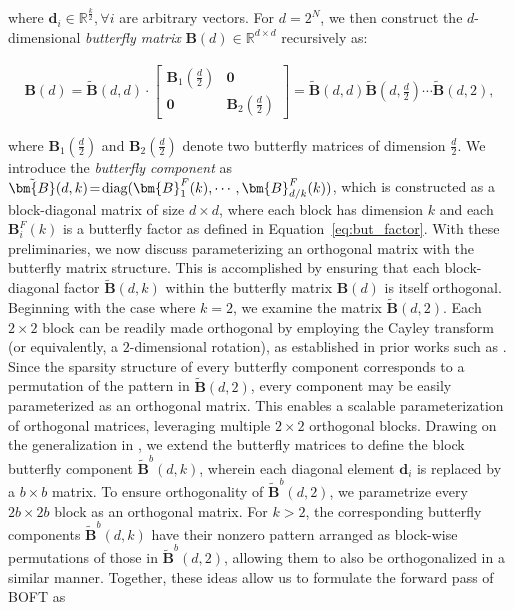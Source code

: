 where $\bm{d}_i\in\mathbb{R}^{\frac{k}{2}},\forall i$ are arbitrary vectors. For $d = 2^N$, we then construct the $d$-dimensional \emph{butterfly matrix} $\bm{B}(d)\in\mathbb{R}^{d\times d}$ recursively as:

\begin{equation}
\begin{aligned}
    \!\!\bm{B}(d)=\tilde{\bm{B}}(d,d)\!\cdot\!\begin{bmatrix}
    \bm{B}_1(\frac{d}{2})\!\!\!\!\! & \bm{0} \\
    \bm{0}\!\!\!\!\! &\bm{B}_2(\frac{d}{2})
    \end{bmatrix}= \tilde{\bm{B}}(d,d)\tilde{\bm{B}}(d,\frac{d}{2})\cdots\tilde{\bm{B}}(d,2),
\end{aligned}
\end{equation}

where $\bm{B}_1(\frac{d}{2})$ and $\bm{B}_2(\frac{d}{2})$ denote two butterfly matrices of dimension $\frac{d}{2}$. We introduce the \emph{butterfly component} as $\thickmuskip=2mu \medmuskip=2mu \tilde{\bm{B}}(d,k)=\text{diag}(\bm{B}^F_1(k),\cdots,\bm{B}^F_{d/k}(k))$, which is constructed as a block-diagonal matrix of size $d\times d$, where each block has dimension $k$ and each $\bm{B}^F_i(k)$ is a butterfly factor as defined in Equation~\ref{eq:but_factor}. With these preliminaries, we now discuss parameterizing an orthogonal matrix with the butterfly matrix structure. This is accomplished by ensuring that each block-diagonal factor $\tilde{\bm{B}}(d,k)$ within the butterfly matrix $\bm{B}(d)$ is itself orthogonal. Beginning with the case where $k=2$, we examine the matrix $\tilde{\bm{B}}(d,2)$. Each $2 \times 2$ block can be readily made orthogonal by employing the Cayley transform (or equivalently, a $2$-dimensional rotation), as established in prior works such as \cite{liu2021orthogonal,qiu2023controlling}. Since the sparsity structure of every butterfly component corresponds to a permutation of the pattern in $\tilde{\bm{B}}(d,2)$, every component may be easily parameterized as an orthogonal matrix. This enables a scalable parameterization of orthogonal matrices, leveraging multiple $2\times 2$ orthogonal blocks. Drawing on the generalization in \cite{chen2022pixelated}, we extend the butterfly matrices to define the block butterfly component $\tilde{\bm{B}}^b(d,k)$, wherein each diagonal element $\bm{d}_i$ is replaced by a $b\times b$ matrix. To ensure orthogonality of $\tilde{\bm{B}}^b(d,2)$, we parametrize every $2b\times 2b$ block as an orthogonal matrix. For $k>2$, the corresponding butterfly components $\tilde{\bm{B}}^b(d,k)$ have their nonzero pattern arranged as block-wise permutations of those in $\tilde{\bm{B}}^b(d,2)$, allowing them to also be orthogonalized in a similar manner. Together, these ideas allow us to formulate the forward pass of BOFT as

